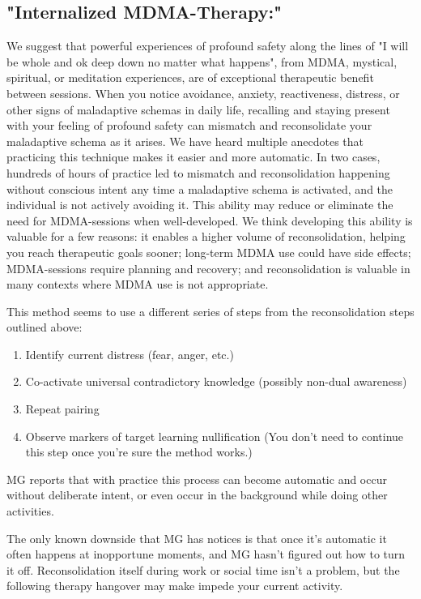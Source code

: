\documentclass[12pt,letterpaper]{book}
\begin{document}
\subsection*{"Internalized MDMA-Therapy:"}
We suggest that powerful experiences of profound safety along the lines of "I will be whole and ok deep down no matter what happens", from MDMA, mystical, spiritual, or meditation experiences, are of exceptional therapeutic benefit between sessions. When you notice avoidance, anxiety, reactiveness, distress, or other signs of maladaptive schemas in daily life, recalling and staying present with your feeling of profound safety can mismatch and reconsolidate your maladaptive schema as it arises. We have heard multiple anecdotes that practicing this technique makes it easier and more automatic. In two cases, hundreds of hours of practice led to mismatch and reconsolidation happening without conscious intent any time a maladaptive schema is activated, and the individual is not actively avoiding it. This ability may reduce or eliminate the need for MDMA-sessions when well-developed. We think developing this ability is valuable for a few reasons: it enables a higher volume of reconsolidation, helping you reach therapeutic goals sooner; long-term MDMA use could have side effects; MDMA-sessions require planning and recovery; and reconsolidation is valuable in many contexts where MDMA use is not appropriate.

This method seems to use a different series of steps from the reconsolidation steps outlined above:
\begin{enumerate}
    \item Identify current distress (fear, anger, etc.)
    \item Co-activate universal contradictory knowledge (possibly non-dual awareness)
    \item Repeat pairing
    \item Observe markers of target learning nullification (You don't need to continue this step once you're sure the method works.)
\end{enumerate}
MG reports that with practice this process can become automatic and occur without deliberate intent, or even occur in the background while doing other activities.

The only known downside that MG has notices is that once it's automatic it often happens at inopportune moments, and MG hasn't figured out how to turn it off. Reconsolidation itself during work or social time isn't a problem, but the following therapy hangover may make impede your current activity.
\end{document}
